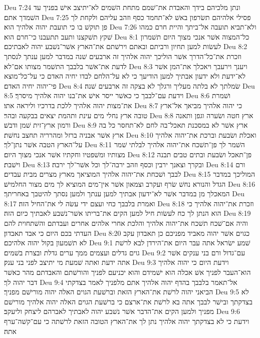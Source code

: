 Deu 7:24  ונתן מלכיהם בידך והאבדת את־שׁמם מתחת השׁמים לא־יתיצב אישׁ בפניך עד השׁמדך אתם׃
Deu 7:25  פסילי אלהיהם תשׂרפון באשׁ לא־תחמד כסף וזהב עליהם ולקחת לך פן תוקשׁ בו כי תועבת יהוה אלהיך הוא׃
Deu 7:26  ולא־תביא תועבה אל־ביתך והיית חרם כמהו שׁקץ תשׁקצנו ותעב תתעבנו כי־חרם הוא׃
Deu 8:1  כל־המצוה אשׁר אנכי מצוך היום תשׁמרון לעשׂות למען תחיון ורביתם ובאתם וירשׁתם את־הארץ אשׁר־נשׁבע יהוה לאבתיכם׃
Deu 8:2  וזכרת את־כל־הדרך אשׁר הוליכך יהוה אלהיך זה ארבעים שׁנה במדבר למען ענתך לנסתך לדעת את־אשׁר בלבבך התשׁמר מצותו אם־לא׃
Deu 8:3  ויענך וירעבך ויאכלך את־המן אשׁר לא־ידעת ולא ידעון אבתיך למען הודיעך כי לא על־הלחם לבדו יחיה האדם כי על־כל־מוצא פי־יהוה יחיה האדם׃
Deu 8:4  שׂמלתך לא בלתה מעליך ורגלך לא בצקה זה ארבעים שׁנה׃
Deu 8:5  וידעת עם־לבבך כי כאשׁר ייסר אישׁ את־בנו יהוה אלהיך מיסרך׃
Deu 8:6  ושׁמרת את־מצות יהוה אלהיך ללכת בדרכיו וליראה אתו׃
Deu 8:7  כי יהוה אלהיך מביאך אל־ארץ טובה ארץ נחלי מים עינת ותהמת יצאים בבקעה ובהר׃
Deu 8:8  ארץ חטה ושׂערה וגפן ותאנה ורמון ארץ־זית שׁמן ודבשׁ׃
Deu 8:9  ארץ אשׁר לא במסכנת תאכל־בה לחם לא־תחסר כל בה ארץ אשׁר אבניה ברזל ומהרריה תחצב נחשׁת׃
Deu 8:10  ואכלת ושׂבעת וברכת את־יהוה אלהיך על־הארץ הטבה אשׁר נתן־לך׃
Deu 8:11  השׁמר לך פן־תשׁכח את־יהוה אלהיך לבלתי שׁמר מצותיו ומשׁפטיו וחקתיו אשׁר אנכי מצוך היום׃
Deu 8:12  פן־תאכל ושׂבעת ובתים טבים תבנה וישׁבת׃
Deu 8:13  ובקרך וצאנך ירבין וכסף וזהב ירבה־לך וכל אשׁר־לך ירבה׃
Deu 8:14  ורם לבבך ושׁכחת את־יהוה אלהיך המוציאך מארץ מצרים מבית עבדים׃
Deu 8:15  המוליכך במדבר הגדל והנורא נחשׁ שׂרף ועקרב וצמאון אשׁר אין־מים המוציא לך מים מצור החלמישׁ׃
Deu 8:16  המאכלך מן במדבר אשׁר לא־ידעון אבתיך למען ענתך ולמען נסתך להיטבך באחריתך׃
Deu 8:17  ואמרת בלבבך כחי ועצם ידי עשׂה לי את־החיל הזה׃
Deu 8:18  וזכרת את־יהוה אלהיך כי הוא הנתן לך כח לעשׂות חיל למען הקים את־בריתו אשׁר־נשׁבע לאבתיך כיום הזה׃
Deu 8:19  והיה אם־שׁכח תשׁכח את־יהוה אלהיך והלכת אחרי אלהים אחרים ועבדתם והשׁתחוית להם העדתי בכם היום כי אבד תאבדון׃
Deu 8:20  כגוים אשׁר יהוה מאביד מפניכם כן תאבדון עקב לא תשׁמעון בקול יהוה אלהיכם׃
Deu 9:1  שׁמע ישׂראל אתה עבר היום את־הירדן לבא לרשׁת גוים גדלים ועצמים ממך ערים גדלת ובצרת בשׁמים׃
Deu 9:2  עם־גדול ורם בני ענקים אשׁר אתה ידעת ואתה שׁמעת מי יתיצב לפני בני ענק׃
Deu 9:3  וידעת היום כי יהוה אלהיך הוא־העבר לפניך אשׁ אכלה הוא ישׁמידם והוא יכניעם לפניך והורשׁתם והאבדתם מהר כאשׁר דבר יהוה לך׃
Deu 9:4  אל־תאמר בלבבך בהדף יהוה אלהיך אתם מלפניך לאמר בצדקתי הביאני יהוה לרשׁת את־הארץ הזאת וברשׁעת הגוים האלה יהוה מורישׁם מפניך׃
Deu 9:5  לא בצדקתך ובישׁר לבבך אתה בא לרשׁת את־ארצם כי ברשׁעת הגוים האלה יהוה אלהיך מורישׁם מפניך ולמען הקים את־הדבר אשׁר נשׁבע יהוה לאבתיך לאברהם ליצחק וליעקב׃
Deu 9:6  וידעת כי לא בצדקתך יהוה אלהיך נתן לך את־הארץ הטובה הזאת לרשׁתה כי עם־קשׁה־ערף אתה׃
